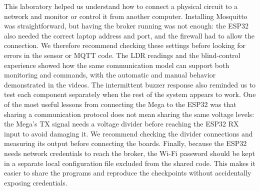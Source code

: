 This laboratory helped us understand how to connect a physical circuit to a network and monitor or control it from another computer. Installing Mosquitto was straightforward, but having the broker running was not enough: the ESP32 also needed the correct laptop address and port, and the firewall had to allow the connection. We therefore recommend checking these settings before looking for errors in the sensor or MQTT code. The LDR readings and the blind-control experience showed how the same communication model can support both monitoring and commands, with the automatic and manual behavior demonstrated in the videos. The intermittent buzzer response also reminded us to test each component separately when the rest of the system appears to work. One of the most useful lessons from connecting the Mega to the ESP32 was that sharing a communication protocol does not mean sharing the same voltage levels: the Mega's TX signal needs a voltage divider before reaching the ESP32 RX input to avoid damaging it. We recommend checking the divider connections and measuring its output before connecting the boards. Finally, because the ESP32 needs network credentials to reach the broker, the Wi-Fi password should be kept in a separate local configuration file excluded from the shared code. This makes it easier to share the programs and reproduce the checkpoints without accidentally exposing credentials.
